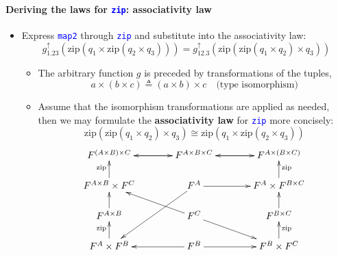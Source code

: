 \paragraph{Deriving the laws for \texttt{\textcolor{blue}{\footnotesize{}zip}}:
associativity law}
\begin{itemize}
\item Express \texttt{\textcolor{blue}{\footnotesize{}map2}} through \texttt{\textcolor{blue}{\footnotesize{}zip}}
and substitute into the associativity law:{\footnotesize{}
\[
g_{1.23}^{\uparrow}\left(\text{zip}\left(q_{1}\times\text{zip}\left(q_{2}\times q_{3}\right)\right)\right)=g_{12.3}^{\uparrow}\left(\text{zip}\left(\text{zip}\left(q_{1}\times q_{2}\right)\times q_{3}\right)\right)
\]
}{\footnotesize\par}
\begin{itemize}
\item The arbitrary function $g$ is preceded by transformations of the
tuples,{\footnotesize{}
\[
a\times\left(b\times c\right)\triangleq\left(a\times b\right)\times c\quad\text{(type isomorphism)}
\]
}{\footnotesize\par}
\item Assume that the isomorphism transformations are applied as needed,
then we may formulate the \textbf{associativity law} for \texttt{\textcolor{blue}{\footnotesize{}zip}}
more concisely:{\footnotesize{}
\[
\text{zip}\left(\text{zip}\left(q_{1}\times q_{2}\right)\times q_{3}\right)\cong\text{zip}\left(q_{1}\times\text{zip}\left(q_{2}\times q_{3}\right)\right)
\]
}\vspace{-0.2cm}
\[
\xymatrix{\xyScaleY{1.4pc}\xyScaleX{3pc}F^{\left(A\times B\right)\times C}\ar[r] & F^{A\times B\times C}\ar[r]\ar[l] & F^{A\times\left(B\times C\right)}\ar[l]\\
F^{A\times B}\times F^{C}\ar[u]\sp(0.6){\text{zip}} & F^{A}\ar[ldd]\ar[r] & F^{A}\times F^{B\times C}\ar[u]\sb(0.6){\text{zip}}\\
F^{A\times B}\ar[u] & F^{C}\ar[rd]\ar[lu] & F^{B\times C}\ar[u]\\
F^{A}\times F^{B}\ar[u]\sp(0.6){\text{zip}} & F^{B}\ar[r]\ar[l] & F^{B}\times F^{C}\ar[u]\sb(0.6){\text{zip}}
}
\]
\end{itemize}
\end{itemize}


